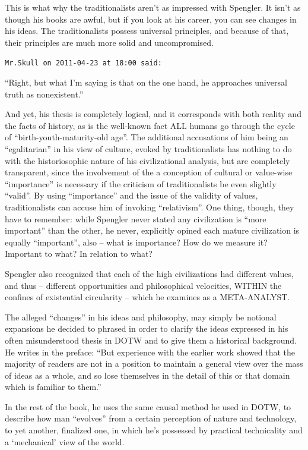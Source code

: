 \begin{footnotesize}
\begin{sffamily}
This is what why the traditionalists aren't as impressed with Spengler. It isn't as though his books are awful, but if you look at his career, you can see changes in his ideas. The traditionalists possess universal principles, and because of that, their principles are much more solid and uncompromised.

\hfill

\texttt{Mr.Skull on 2011-04-23 at 18:00 said:}

``Right, but what I'm saying is that on the one hand, he approaches universal truth as nonexistent.''

And yet, his thesis is completely logical, and it corresponds with both reality and the facts of history, as is the well-known fact ALL humans go through the cycle of ``birth-youth-maturity-old age''. The additional accusations of him being an ``egalitarian'' in his view of culture, evoked by traditionalists has nothing to do with the historiosophic nature of his civilizational analysis, but are completely transparent, since the involvement of the a conception of cultural or value-wise ``importance'' is necessary if the criticism of traditionalists be even slightly ``valid''. By using ``importance'' and the issue of the validity of values, traditionalists can accuse him of invoking ``relativism''. One thing, though, they have to remember: while Spengler never stated any civilization is ``more important'' than the other, he never, explicitly opined each mature civilization is equally ``important'', also -- what is importance? How do we measure it? Important to what? In relation to what?

Spengler also recognized that each of the high civilizations had different values, and thus -- different opportunities and philosophical velocities, WITHIN the confines of existential circularity -- which he examines as a META-ANALYST.

The alleged ``changes'' in his ideas and philosophy, may simply be notional expansions he decided to phrased in order to clarify the ideas expressed in his often misunderstood thesis in DOTW and to give them a historical background. He writes in the preface: ``But experience with the earlier work showed that the majority of readers are not in a position to maintain a general view over the mass of ideas as a whole, and so lose themselves in the detail of this or that domain which is familiar to them.''

In the rest of the book, he uses the same causal method he used in DOTW, to describe how man ``evolves'' from a certain perception of nature and technology, to yet another, finalized one, in which he's possessed by practical technicality and a `mechanical' view of the world.


\end{sffamily}
\end{footnotesize}
